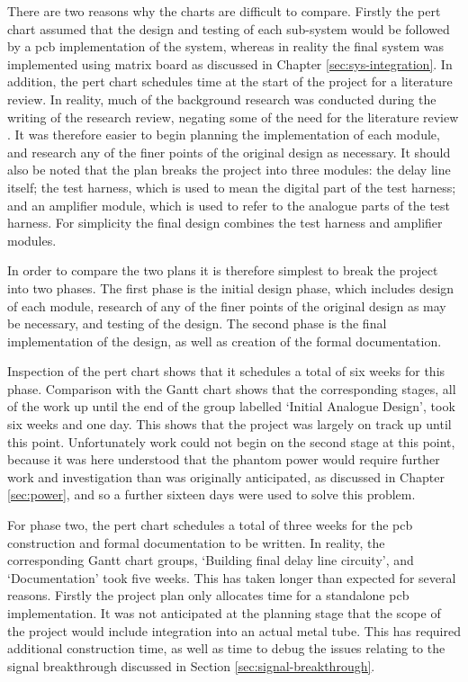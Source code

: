 There are two reasons why the charts are difficult to compare. Firstly the \gls{pert} chart assumed that the design and testing of each sub-system would be followed by a \gls{pcb} implementation of the system, whereas in reality the final system was implemented using matrix board as discussed in Chapter \ref{sec:sys-integration}. In addition, the \gls{pert} chart schedules time at the start of the project for a literature review. In reality, much of the background research was conducted during the writing of the research review, negating some of the need for the literature review \cite{tyler2017}. It was therefore easier to begin planning the implementation of each module, and research any of the finer points of the original design as necessary. It should also be noted that the plan breaks the project into three modules: the delay line itself; the test harness, which is used to mean the digital part of the test harness; and an amplifier module, which is used to refer to the analogue parts of the test harness. For simplicity the final design combines the test harness and amplifier modules.

In order to compare the two plans it is therefore simplest to break the project into two phases. The first phase is the initial design phase, which includes design of each module, research of any of the finer points of the original design as may be necessary, and testing of the design. The second phase is the final implementation of the design, as well as creation of the formal documentation.

Inspection of the \gls{pert} chart shows that it schedules a total of six weeks for this phase. Comparison with the Gantt chart shows that the corresponding stages, all of the work up until the end of the group labelled `Initial Analogue Design', took six weeks and one day. This shows that the project was largely on track up until this point. Unfortunately work could not begin on the second stage at this point, because it was here understood that the phantom power would require further work and investigation than was originally anticipated, as discussed in Chapter \ref{sec:power}, and so a further sixteen days were used to solve this problem.

For phase two, the \gls{pert} chart schedules a total of three weeks for the \gls{pcb} construction and formal documentation to be written. In reality, the corresponding Gantt chart groups, `Building final delay line circuity', and `Documentation' took five weeks. This has taken longer than expected for several reasons. Firstly the project plan only allocates time for a standalone \gls{pcb} implementation. It was not anticipated at the planning stage that the scope of the project would include integration into an actual metal tube. This has required additional construction time, as well as time to debug the issues relating to the signal breakthrough discussed in Section \ref{sec:signal-breakthrough}.

